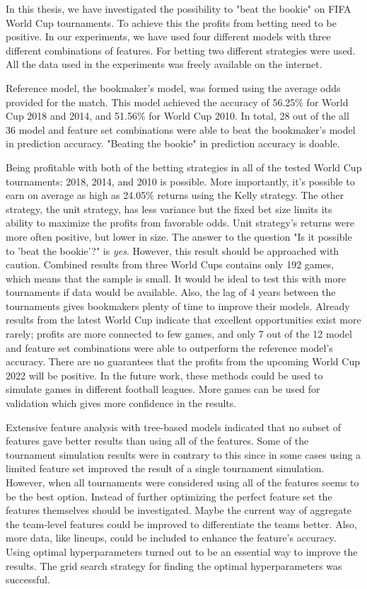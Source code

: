 In this thesis, we have investigated the possibility to "beat the bookie" on FIFA World Cup tournaments. To achieve this the profits from betting need to be positive. In our experiments, we have used four different models with three different combinations of features. For betting two different strategies were used. All the data used in the experiments was freely available on the internet.

Reference model, the bookmaker's model, was formed using the average odds provided for the match. This model achieved the accuracy of 56.25\% for World Cup 2018 and 2014, and 51.56\% for World Cup 2010. In total, 28 out of the all 36 model and feature set combinations were able to beat the bookmaker's model in prediction accuracy. "Beating the bookie" in prediction accuracy is doable.

Being profitable with both of the betting strategies in all of the tested World Cup tournaments: 2018, 2014, and 2010 is possible. More importantly, it's possible to earn on average as high as 24.05\% returns using the Kelly strategy. The other strategy, the unit strategy, has less variance but the fixed bet size limits its ability to maximize the profits from favorable odds. Unit strategy's returns were more often positive, but lower in size. The answer to the question
"Is it possible to 'beat the bookie'?" is \textit{yes}. However, this result should be approached with caution. Combined results from three World Cups contains only 192 games, which means that the sample is small. It would be ideal to test this with more tournaments if data would be available.
Also, the lag of 4 years between the tournaments gives bookmakers plenty of time to improve their models. Already results from the latest World Cup indicate that excellent opportunities exist more rarely; profits are more connected to few games, and only 7 out of the 12 model and feature set combinations were able to outperform the reference model's accuracy. There are no guarantees that the profits from the upcoming World Cup 2022 will be positive. In the future work, these methods could be used to simulate games in different football leagues. More games can be used for validation which gives more confidence in the results.

Extensive feature analysis with tree-based models indicated that no subset of features gave better results than using all of the features. Some of the tournament simulation results were in contrary to this since in some cases using a limited feature set improved the result of a single tournament simulation. However, when all tournaments were considered using all of the features seems to be the best option. Instead of further optimizing the perfect feature set the features themselves should be investigated. Maybe the current way of aggregate the team-level features could be improved to differentiate the teams better. Also, more data, like lineups, could be included to enhance the feature's accuracy. Using optimal hyperparameters turned out to be an essential way to improve the results. The grid search strategy for finding the optimal hyperparameters was successful.

